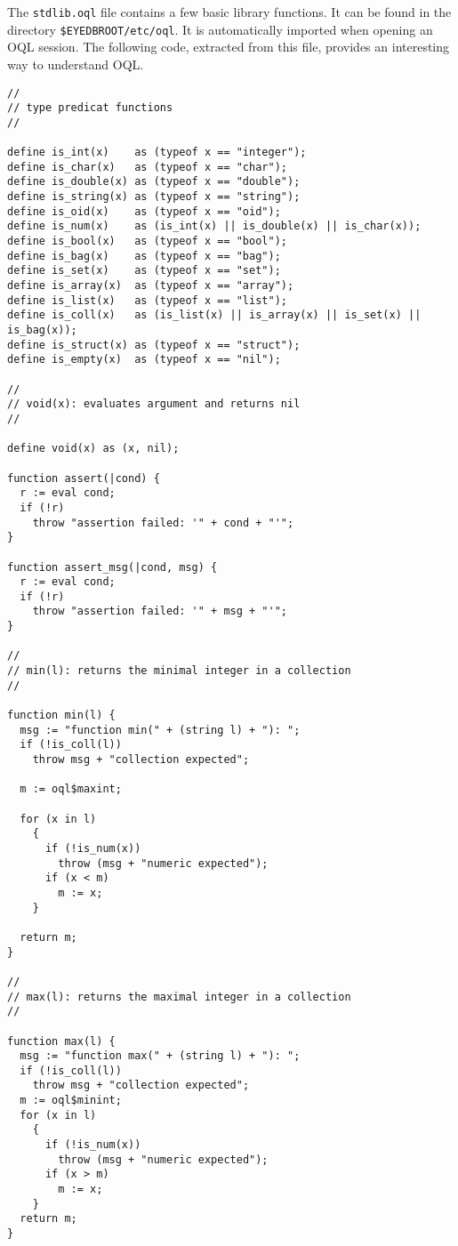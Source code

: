The \texttt{stdlib.oql} file contains a few basic library functions.
It can be found in the directory \texttt{\$EYEDBROOT/etc/oql}.
It is automatically imported when opening an OQL session.
The following code, extracted from this file, provides an interesting way to
understand OQL.
\begin{verbatim}
//
// type predicat functions
//

define is_int(x)    as (typeof x == "integer");
define is_char(x)   as (typeof x == "char");
define is_double(x) as (typeof x == "double");
define is_string(x) as (typeof x == "string");
define is_oid(x)    as (typeof x == "oid");
define is_num(x)    as (is_int(x) || is_double(x) || is_char(x));
define is_bool(x)   as (typeof x == "bool");
define is_bag(x)    as (typeof x == "bag");
define is_set(x)    as (typeof x == "set");
define is_array(x)  as (typeof x == "array");
define is_list(x)   as (typeof x == "list");
define is_coll(x)   as (is_list(x) || is_array(x) || is_set(x) || is_bag(x));
define is_struct(x) as (typeof x == "struct");
define is_empty(x)  as (typeof x == "nil");

//
// void(x): evaluates argument and returns nil
//

define void(x) as (x, nil);

function assert(|cond) {
  r := eval cond;
  if (!r)
    throw "assertion failed: '" + cond + "'";
}

function assert_msg(|cond, msg) {
  r := eval cond;
  if (!r)
    throw "assertion failed: '" + msg + "'";
}

//
// min(l): returns the minimal integer in a collection
//

function min(l) {
  msg := "function min(" + (string l) + "): ";
  if (!is_coll(l))
    throw msg + "collection expected";

  m := oql$maxint;

  for (x in l)
    {
      if (!is_num(x))
        throw (msg + "numeric expected");
      if (x < m) 
        m := x;
    }

  return m;
}

//
// max(l): returns the maximal integer in a collection
//

function max(l) {
  msg := "function max(" + (string l) + "): ";
  if (!is_coll(l))
    throw msg + "collection expected";
  m := oql$minint;
  for (x in l)
    {
      if (!is_num(x))
        throw (msg + "numeric expected");
      if (x > m)
        m := x;
    }
  return m;
}


\end{verbatim}
